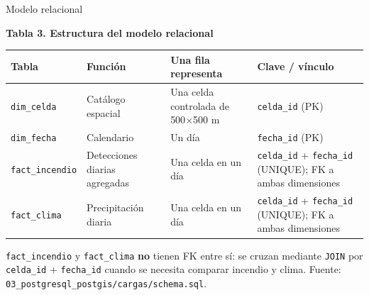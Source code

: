 \documentclass[aspectratio=169,11pt]{beamer}
\newcommand{\fuente}[1]{{\vfill\tiny\color{GrisTexto!70!black} Fuente: #1}}
\begin{document}
\begin{frame}{Modelo relacional}
  \raggedright{\small\textbf{Tabla 3. Estructura del modelo relacional}\par}
  \small
  \begin{center}
  \setlength{\tabcolsep}{3pt}
  \begin{tabular}{@{}p{2.55cm}p{2.5cm}p{3.5cm}p{2.9cm}@{}}
  \toprule
  \textbf{Tabla} & \textbf{Funci\'on} & \textbf{Una fila representa} & \textbf{Clave / v\'inculo} \\
  \midrule
  \texttt{dim\_celda} & Cat\'alogo espacial & Una celda controlada de 500$\times$500 m & \texttt{celda\_id} (PK) \\
  \texttt{dim\_fecha} & Calendario & Un d\'ia & \texttt{fecha\_id} (PK) \\
  \texttt{fact\_incendio} & Detecciones diarias agregadas & Una celda en un d\'ia & \texttt{celda\_id} + \texttt{fecha\_id} (UNIQUE); FK a ambas dimensiones \\
  \texttt{fact\_clima} & Precipitaci\'on diaria & Una celda en un d\'ia & \texttt{celda\_id} + \texttt{fecha\_id} (UNIQUE); FK a ambas dimensiones \\
  \bottomrule
  \end{tabular}
  \end{center}
  {\small \texttt{fact\_incendio} y \texttt{fact\_clima} \textbf{no} tienen FK entre s\'i: se cruzan mediante \texttt{JOIN} por \texttt{celda\_id} + \texttt{fecha\_id} cuando se necesita comparar incendio y clima.}
  \fuente{\texttt{03\_postgresql\_postgis/cargas/schema.sql}.}
\end{frame}
\end{document}
